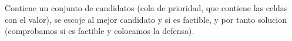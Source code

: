Contiene un conjunto de candidatos (cola de prioridad, que contiene las celdas con el valor), se escoje al mejor candidato y si es factible, y por tanto solucion (comprobamos si es factible y colocamos la defensa). 

